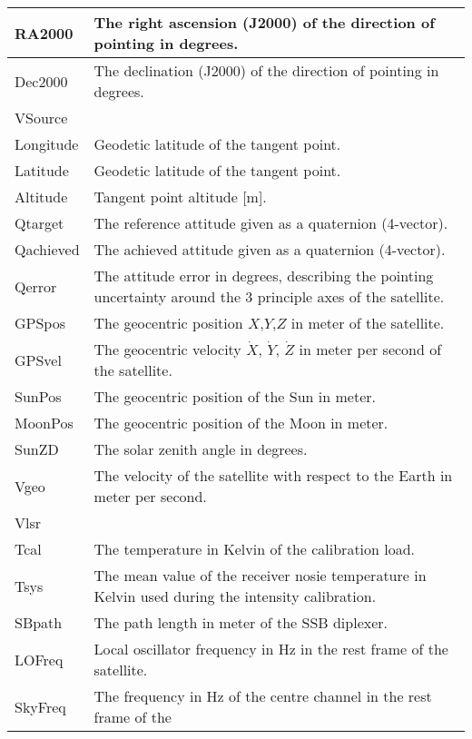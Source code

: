 \begin{longtable}{| p{} | p{} |}
     RA2000          & The right ascension (J2000) of the direction of pointing in degrees. \\ \hline
     Dec2000         & The declination (J2000) of the direction of pointing in degrees. \\ \hline
     VSource         & \\ \hline
     Longitude       & Geodetic latitude of the tangent point.\\ \hline
     Latitude        & Geodetic latitude of the tangent point.\\ \hline
     Altitude        & Tangent point altitude [m].\\ \hline
     Qtarget         & The reference attitude given as a quaternion (4-vector).\\ \hline
     Qachieved       & The achieved attitude given as a quaternion (4-vector).\\ \hline
     Qerror          & The attitude error in degrees, describing the pointing uncertainty
                       around the 3 principle axes of the satellite. \\ \hline
     GPSpos          & The geocentric position $X$,$Y$,$Z$ in meter of the satellite.\\ \hline
     GPSvel          & The geocentric velocity $\dot X$, $\dot Y$, $\dot Z$ in meter per 
                         second of the satellite.\\ \hline
     SunPos          & The geocentric position of the Sun in meter.\\ \hline
     MoonPos         & The geocentric position of the Moon in meter.\\ \hline
     SunZD           & The solar zenith angle in degrees. \\ \hline
     Vgeo            & The velocity of the satellite with respect to the Earth in meter per second.\\ \hline
     Vlsr            & \\ \hline
     Tcal            & The temperature in Kelvin of the calibration load.\\ \hline
     Tsys            & The mean value of the receiver nosie temperature in Kelvin used during the intensity calibration.\\ \hline
     SBpath          & The path length in meter of the SSB diplexer. \\ \hline
     LOFreq          & Local oscillator frequency in Hz in the rest frame of the satellite.\\ \hline
     SkyFreq         & The frequency in Hz of the centre channel in the rest frame of the

\end{longtable}
